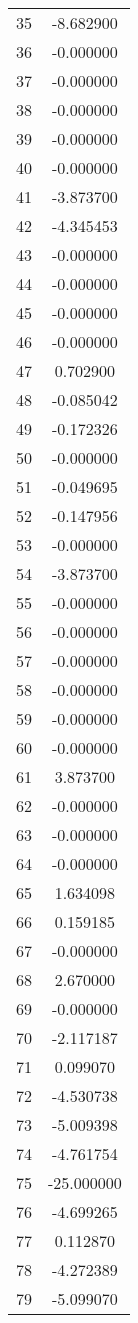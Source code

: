 \documentclass[12pt]{article}
\begin{document}
\begin{longtable}{@{}cc@{}}
35 & -8.682900 \\
36 & -0.000000 \\
37 & -0.000000 \\
38 & -0.000000 \\
39 & -0.000000 \\
40 & -0.000000 \\
41 & -3.873700 \\
42 & -4.345453 \\
43 & -0.000000 \\
44 & -0.000000 \\
45 & -0.000000 \\
46 & -0.000000 \\
47 & 0.702900 \\
48 & -0.085042 \\
49 & -0.172326 \\
50 & -0.000000 \\
51 & -0.049695 \\
52 & -0.147956 \\
53 & -0.000000 \\
54 & -3.873700 \\
55 & -0.000000 \\
56 & -0.000000 \\
57 & -0.000000 \\
58 & -0.000000 \\
59 & -0.000000 \\
60 & -0.000000 \\
61 & 3.873700 \\
62 & -0.000000 \\
63 & -0.000000 \\
64 & -0.000000 \\
65 & 1.634098 \\
66 & 0.159185 \\
67 & -0.000000 \\
68 & 2.670000 \\
69 & -0.000000 \\
70 & -2.117187 \\
71 & 0.099070 \\
72 & -4.530738 \\
73 & -5.009398 \\
74 & -4.761754 \\
75 & -25.000000 \\
76 & -4.699265 \\
77 & 0.112870 \\
78 & -4.272389 \\
79 & -5.099070 \\

\end{longtable}
\end{document}
